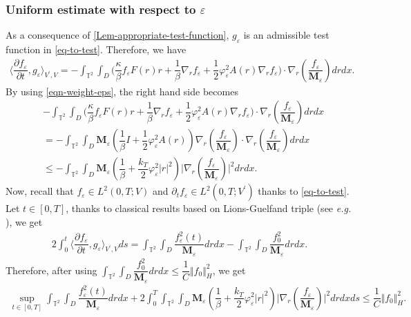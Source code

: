 \documentclass[a4paper,12pt, reqno]{amsart}
\renewcommand{\k}{\kappa}
\begin{document}
    \subsubsection*{Uniform estimate with respect to $\varepsilon$}
  As a consequence of \autoref{Lem-appropriate-test-function}, $g_\varepsilon$ is an admissible test function in \eqref{eq-to-test}. Therefore, we have
  \begin{align}
    \langle\dfrac{\partial f_\varepsilon}{\partial t},g_\varepsilon\rangle_{V^\prime,V}=-\int_{\mathbb{T}^2}\int_D\big ( \dfrac{\k}{\beta} f_\varepsilon F(r)r+\dfrac{1}{\beta}\nabla_rf_\varepsilon+ \dfrac{1}{2}\varphi_\varepsilon^2 A(r) \nabla_rf_\varepsilon\big)\cdot \nabla_r(\dfrac{f_\varepsilon}{\mathbf{M}_\varepsilon}) drdx.
\end{align}
By using \eqref{eqn-weight-eps}, the right hand side becomes
\begin{align*}
    &-\int_{\mathbb{T}^2}\int_D\big ( \dfrac{\k}{\beta} f_\varepsilon F(r)r+\dfrac{1}{\beta}\nabla_rf_\varepsilon+ \dfrac{1}{2}\varphi_\varepsilon^2 A(r) \nabla_rf_\varepsilon\big)\cdot \nabla_r(\dfrac{f_\varepsilon}{\mathbf{M}_\varepsilon}) drdx\\&=-\int_{\mathbb{T}^2}\int_D \mathbf{M}_\varepsilon (\dfrac{1}{\beta}I+\dfrac{1}{2}\varphi_\varepsilon^2A(r))\nabla_r(\dfrac{f_\varepsilon}{\mathbf{M}_\varepsilon})\cdot \nabla_r(\dfrac{f_\varepsilon}{\mathbf{M}_\varepsilon}) drdx\\
    &\leq-\int_{\mathbb{T}^2}\int_D \mathbf{M}_\varepsilon (\dfrac{1}{\beta}+\dfrac{k_T}{2}\varphi_\varepsilon^2\vert r\vert^2)\vert \nabla_r(\dfrac{f_\varepsilon}{\mathbf{M}_\varepsilon})\vert^2 dr dx.
\end{align*}
Now, recall that  $f_\varepsilon \in L^2(0, T;V)$ and $\partial_tf_\varepsilon \in L^2(0, T;V^\prime)$ thanks to   \eqref{eq-to-test}. Let $t\in [0,T]$,  thanks to classical results based on  Lions-Guelfand triple (see \textit{e.g.} \cite[Theorem 3.1.]{Lions-Magenes}), we get
\begin{align*}
  2  \int_0^t \langle\dfrac{\partial f_\varepsilon}{\partial t},g_\varepsilon\rangle_{V^\prime,V} ds= \int_{\mathbb{T}^2}\int_D\dfrac{f_\varepsilon^2(t)}{\mathbf{M}_\varepsilon}drdx-\int_{\mathbb{T}^2}\int_D\dfrac{f_0^2}{\mathbf{M}_\varepsilon}drdx.
\end{align*}
Therefore, after using  $\int_{\mathbb{T}^2}\int_D\dfrac{f_0^2}{\mathbf{M}_\varepsilon}drdx \leq \dfrac{1}{C}\Vert f_0\Vert_H^2$, we get
\begin{align}\label{key-est-eps-weight}
  \sup_{t\in[0,T]}    \int_{\mathbb{T}^2}\int_D\dfrac{f_\varepsilon^2(t)}{\mathbf{M}_\varepsilon}drdx+2\int_0^T\int_{\mathbb{T}^2}\int_D \mathbf{M}_\varepsilon (\dfrac{1}{\beta}+\dfrac{k_T}{2}\varphi_\varepsilon^2\vert r\vert^2)\vert \nabla_r(\dfrac{f_\varepsilon}{\mathbf{M}_\varepsilon})\vert^2 dr dx ds\leq \dfrac{1}{C}\Vert f_0\Vert_H^2.
\end{align}
\end{document}
